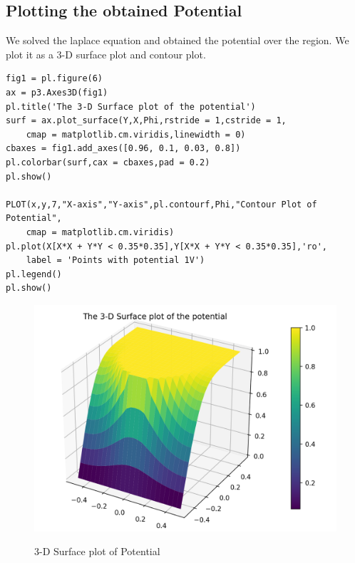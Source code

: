 \documentclass[11pt, a4paper]{article}
\begin{document}
\subsection{Plotting the obtained Potential}
We solved the laplace equation and obtained the potential over the region. We plot it as a 3-D surface plot and contour plot.
\begin{verbatim}
fig1 = pl.figure(6)
ax = p3.Axes3D(fig1)
pl.title('The 3-D Surface plot of the potential')
surf = ax.plot_surface(Y,X,Phi,rstride = 1,cstride = 1,
	cmap = matplotlib.cm.viridis,linewidth = 0)
cbaxes = fig1.add_axes([0.96, 0.1, 0.03, 0.8]) 
pl.colorbar(surf,cax = cbaxes,pad = 0.2)
pl.show()

PLOT(x,y,7,"X-axis","Y-axis",pl.contourf,Phi,"Contour Plot of Potential",
	cmap = matplotlib.cm.viridis)
pl.plot(X[X*X + Y*Y < 0.35*0.35],Y[X*X + Y*Y < 0.35*0.35],'ro',
	label = 'Points with potential 1V')
pl.legend()
pl.show()
\end{verbatim}
\begin{figure}[H]
   	\centering
   	\includegraphics[scale=0.5]{surface_potl.png}
   	\label{fig:3d_potl}
   	\caption{3-D Surface plot of Potential}
\end{figure}
\end{document}
